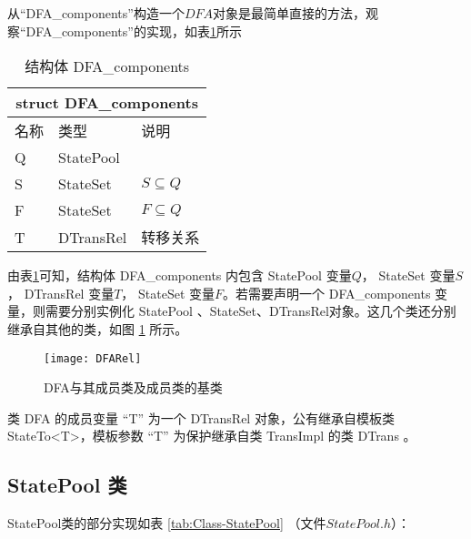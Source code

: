 从“DFA\_components”构造一个$DFA$对象是最简单直接的方法，观察“DFA\_components”的实现，如表\ref{tab:DFA-components}所示
\begin{table}[!htbp]
    \caption{结构体 DFA\_components}
    \label{tab:DFA-components}
    \centering
    \small%
    \setlength{\tabcolsep}{4pt}%
    \renewcommand{\arraystretch}{1.2}%
        \begin{tabular}{p{3em}<{\centering} p{5em}<{\raggedright} p{5em}<{\raggedright}} %
        \toprule 
         \multicolumn{3}{c}{struct DFA\_components} \\
        \midrule
        名称& 类型 & \mbox{说明} \\
        \midrule
        Q & StatePool &           \\
        S & StateSet  &  $S\subseteq Q$ \\
        F & StateSet  &  $F\subseteq Q$ \\
        T & DTransRel &  转移关系  \\
        \bottomrule
    \end{tabular}
\end{table}
由表\ref{tab:DFA-components}可知，结构体 DFA\_components 内包含 StatePool 变量$Q$， StateSet 变量$S$， DTransRel 变量$T$， StateSet 变量$F$。若需要声明一个 DFA\_components 变量，则需要分别实例化 StatePool 、StateSet、DTransRel对象。这几个类还分别继承自其他的类，如图 \ref{fig:DFARel} 所示。

\begin{figure}[!htbp]
    \centering
    \texttt{[image: DFARel]}
    \caption{DFA与其成员类及成员类的基类}
    \label{fig:DFARel}
\end{figure}

类 DFA 的成员变量 “T” 为一个 DTransRel 对象，公有继承自模板类 StateTo<T>，模板参数 “T” 为保护继承自类 TransImpl 的类 DTrans 。

\subsection{StatePool 类}
StatePool类的部分实现如表 \ref{tab:Class-StatePool} （文件$StatePool.h$）：

